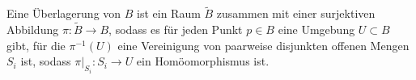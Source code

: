 Eine Überlagerung von $B$ ist ein Raum $\widetilde{B}$ \pause zusammen mit einer surjektiven Abbildung $\pi\colon\widetilde{B}\to B$, \pause sodass es für jeden Punkt $p\in B$ eine Umgebung $U\subset B$ gibt, \pause für die $\pi^{-1}(U)$ eine Vereinigung von paarweise disjunkten offenen Mengen $S_i$ ist, \pause sodass $\pi|_{S_i}\colon  S_i\to U$ ein Homöomorphismus ist.